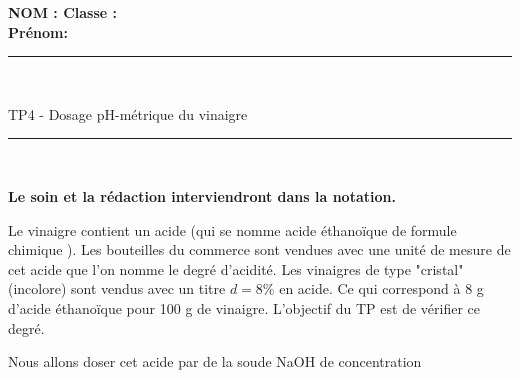 \documentclass[11pt,a4paper]{article}
\begin{document}

\flushleft \textbf{NOM : \hfill Classe : \hspace{3cm} ~~\\[2mm]
Prénom:\\[0,4cm]
}
\hrule\
\\[0,2cm]

\begin{center}
 \LARGE{TP4 - Dosage pH-métrique du vinaigre    }
\end{center}

\vspace{3 mm}

\normalsize

\hrule\
\\[0,2cm]
   \begin{center}
   \textbf{Le soin et la rédaction interviendront dans la notation.}
   \end{center} 
\noindent%
\begin{minipage}{.45\textwidth}%
Le vinaigre contient un acide (qui se nomme acide éthanoïque de formule chimique ). Les bouteilles du commerce sont vendues avec une unité de mesure de cet acide que l'on nomme le degré d'acidité. Les vinaigres de type "cristal" (incolore) sont vendus avec un titre $d=8\%$ en acide. Ce qui correspond à 8 g d'acide éthanoïque pour 100 g de vinaigre. L'objectif du TP est de vérifier ce degré. \\

\vspace{0.5cm}

Nous allons doser cet acide par de la soude NaOH de concentration  


\end{minipage}%
\hfill
\end{document}
